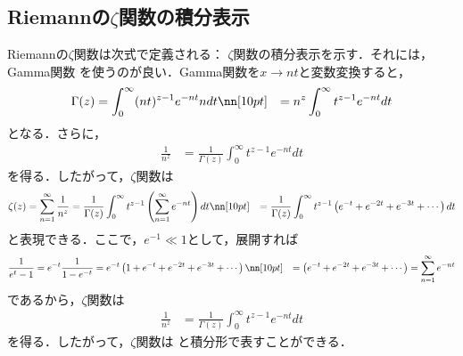\subsection{Riemannの$\zeta$関数の積分表示}
Riemannの$\zeta$関数は次式で定義される：
\be\label{z1}
\ee
$\zeta$関数の積分表示を示す．それには，Gamma関数
\be
{}
\ee
を使うのが良い．Gamma関数を$x\to nt$と変数変換すると，
\begin{align}
\Gamma(z)&=\displaystyle\int_0^\infty (nt)^{z-1}e^{-nt}ndt\nn[10pt]
&=n^z\displaystyle\int_0^\infty t^{z-1}e^{-nt}dt
\end{align}
となる．さらに，
\begin{align}\label{z2}
\frac{1}{n^z}&=\frac{1}{\Gamma(z)}\displaystyle\int_0^\infty t^{z-1}e^{-nt}dt
\end{align}
を得る．したがって，$\zeta$関数は
\begin{align}
\zeta(z)=\displaystyle\sum_{n=1}^{\infty}\frac{1}{n^z}&=\frac{1}{\Gamma(z)}\displaystyle\int_0^\infty t^{z-1}
\left(\displaystyle\sum_{n=1}^{\infty}e^{-nt}\right)dt\nn[10pt]
&=\frac{1}{\Gamma(z)}\displaystyle\int_0^\infty t^{z-1}
\left(e^{-t}+e^{-2t}+e^{-3t}+\cdots\right)dt
\end{align}
と表現できる．ここで，$e^{-1}\ll1$として，展開すれば
\begin{align}
\frac{1}{e^t-1}&=e^{-t}\frac{1}{1-e^{-t}}=e^{-t}\left(1+e^{-t}+e^{-2t}+e^{-3t}+\cdots\right)\nn[10pt]
&=\left(e^{-t}+e^{-2t}+e^{-3t}+\cdots\right)=\displaystyle\sum_{n=1}^{\infty}e^{-nt}
\end{align}
であるから，$\zeta$関数は
\begin{align}
\frac{1}{n^z}&=\frac{1}{\Gamma(z)}\displaystyle\int_0^\infty t^{z-1}e^{-nt}dt
\end{align}
を得る．したがって，$\zeta$関数は
\be
{}
\ee
と積分形で表すことができる．














%
